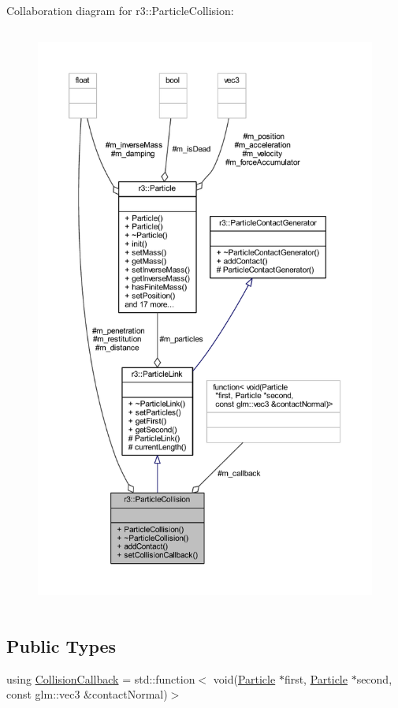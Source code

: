 Collaboration diagram for r3\+:\+:Particle\+Collision\+:\nopagebreak
\begin{figure}[H]
\begin{center}
\leavevmode
\includegraphics[height=550pt]{classr3_1_1_particle_collision__coll__graph}
\end{center}
\end{figure}
\subsection*{Public Types}
\begin{DoxyCompactItemize}
\item 
using \mbox{\hyperlink{classr3_1_1_particle_collision_a85d1a02ec35335322e5a3ce47f0e46cf}{Collision\+Callback}} = std\+::function$<$ void(\mbox{\hyperlink{classr3_1_1_particle}{Particle}} $\ast$first, \mbox{\hyperlink{classr3_1_1_particle}{Particle}} $\ast$second, const glm\+::vec3 \&contact\+Normal)$>$
\end{DoxyCompactItemize}
